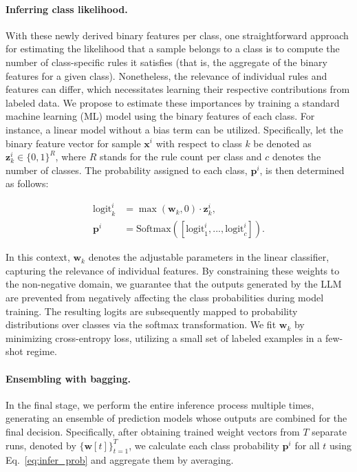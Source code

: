 \paragraph{Inferring class likelihood.} With these newly derived binary features per class, one straightforward approach for estimating the likelihood that a sample belongs to a class is to compute the number of class-specific rules it satisfies (that is, the aggregate of the binary features for a given class). Nonetheless, the relevance of individual rules and features can differ, which necessitates learning their respective contributions from labeled data. We propose to estimate these importances by training a standard machine learning (ML) model using the binary features of each class. For instance, a linear model without a bias term can be utilized. Specifically, let the binary feature vector for sample $\mathbf{x}^i$ with respect to class $k$ be denoted as $\mathbf{z}_k^i \in \{0, 1\}^R$, where $R$ stands for the rule count per class and $c$ denotes the number of classes. The probability assigned to each class, $\mathbf{p}^i$, is then determined as follows:

\begin{align}
\text{logit}_k^i &= \max(\mathbf{w}_k, 0) \cdot \mathbf{z}_k^i, \nonumber \\
\mathbf{p}^i &= \text{Softmax}({[\text{logit}_{1}^i, ..., \text{logit}_{c}^i]}). \label{eq:infer_prob}
\end{align}

In this context, $\mathbf{w}_k$ denotes the adjustable parameters in the linear classifier, capturing the relevance of individual features. By constraining these weights to the non-negative domain, we guarantee that the outputs generated by the LLM are prevented from negatively affecting the class probabilities during model training. The resulting logits are subsequently mapped to probability distributions over classes via the softmax transformation. We fit $\mathbf{w}_k$ by minimizing cross-entropy loss, utilizing a small set of labeled examples in a few-shot regime.

\vspace*{-0.12in}
\paragraph{Ensembling with bagging.} In the final stage, we perform the entire inference process multiple times, generating an ensemble of prediction models whose outputs are combined for the final decision. Specifically, after obtaining trained weight vectors from $T$ separate runs, denoted by $\{\mathbf{w}[t]\}_{t=1}^T$, we calculate each class probability $\mathbf{p}^i$ for all $t$ using Eq.~\ref{eq:infer_prob} and aggregate them by averaging.

